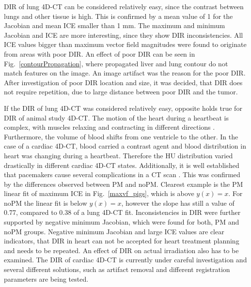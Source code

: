 \documentclass[type=dr, dr=rernat, accentcolor=tud7b,colorbacktitle, bigchapter, openright, twoside, 12pt ]{tudthesis}
\begin{document}
DIR of lung 4D-CT can be considered relatively easy, since the contrast between lungs and other tissue is high. 
This is confirmed by a mean value of 1 for the Jacobian and mean ICE smaller than 1 mm. The maximum and minimum Jacobian and ICE are more interesting, since they show 
DIR inconsistencies. All ICE values bigger than maximum vector field magnitudes were found to originate from areas with poor DIR. An effect of poor DIR can be seen in Fig.~\ref{contourPropagation},
where propagated liver and lung contour do not match features on the image. An image artifact was the reason for the poor DIR. After investigation of poor DIR location and size, 
it was decided, that DIR does not require repetition, due to large distance between poor DIR and the tumor.

If the DIR of lung 4D-CT was considered relatively easy, opposite holds true for DIR of animal study 4D-CT. The motion of the heart during a heartbeat is complex, 
with muscles relaxing and contracting in different directions \cite{Seeley2007}. Furthermore,
the volume of blood shifts from one ventricle to the other. In the case of a cardiac 4D-CT, blood carried a contrast agent and blood distribution in heart was changing during a heartbeat. 
Therefore the HU distribution varied drastically in different cardiac 4D-CT states. Additionally, it is well established that pacemakers cause several complications in a CT scan \cite{Mak2012}. This was
confirmed by the differences observed between PM and noPM. Clearest example is the PM linear fit of maximum ICE in Fig.~\ref{maxvf_pigs}, which is above $y(x) = x$. For noPM the linear
fit is below $y(x)=x$, however the slope has still a value of 0.77, compared to 0.38 of a lung 4D-CT fit. Inconsistencies in DIR were further supported by negative minimum Jacobian, which were found for both,
PM and noPM groups. Negative minimum Jacobian and large ICE values are clear indicators, that DIR in heart can not be 
accepted for heart treatment planning and needs to be repeated. An effect of DIR on actual irradiation also has to be examined.
The DIR of cardiac 4D-CT is currently under careful investigation
and several different solutions, such as artifact removal and different registration parameters are being tested.
\end{document}
